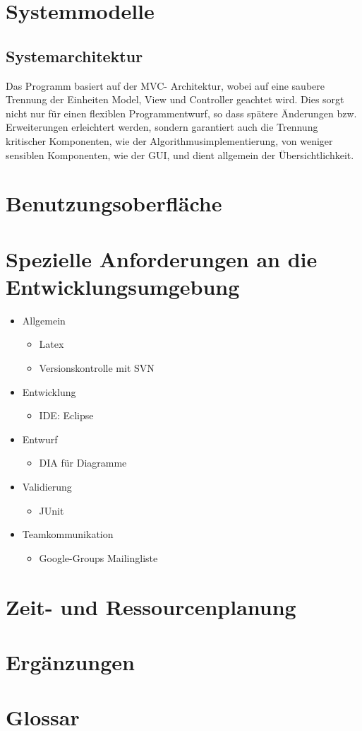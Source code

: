 \documentclass[10pt,a4paper]{article}
\begin{document}
\section{Systemmodelle}
\subsection{Systemarchitektur}
Das Programm basiert auf der MVC- Architektur, wobei auf eine saubere Trennung der Einheiten Model, View und Controller geachtet wird. Dies sorgt nicht nur für einen flexiblen Programmentwurf, so dass spätere Änderungen bzw. Erweiterungen erleichtert werden, sondern garantiert auch die Trennung kritischer Komponenten, wie der Algorithmusimplementierung, von weniger sensiblen Komponenten, wie der GUI, und dient allgemein der Übersichtlichkeit.

\section{Benutzungsoberfläche}

\section{Spezielle Anforderungen an die Entwicklungsumgebung}
\begin{itemize}
	\item Allgemein
	\begin{itemize}
		\item Latex
		\item Versionskontrolle mit SVN
	\end{itemize}
	\item Entwicklung
	\begin{itemize}
		\item IDE: Eclipse
	\end{itemize}
	\item Entwurf
	\begin{itemize}
		\item DIA für Diagramme
	\end{itemize}
	\item Validierung
	\begin{itemize}
		\item JUnit
	\end{itemize}
	\item Teamkommunikation
	\begin{itemize}
		\item Google-Groups Mailingliste
	\end{itemize}
\end{itemize}

\section{Zeit- und Ressourcenplanung}

\section{Ergänzungen}

\section{Glossar}
\end{document}
